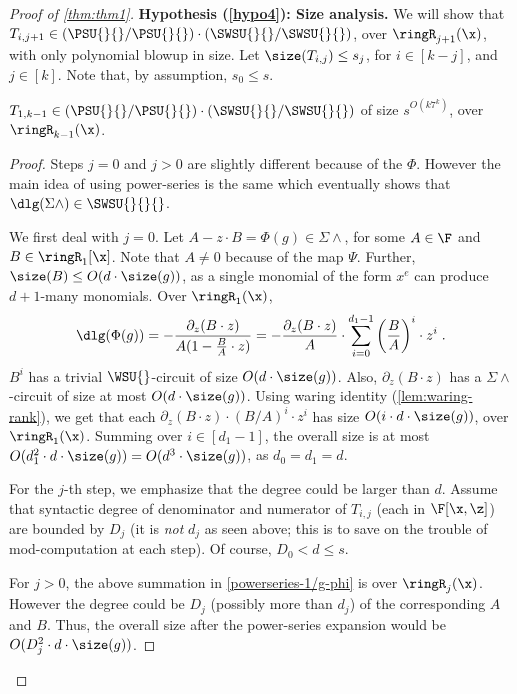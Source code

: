 \begin{proof}[Proof of \autoref{thm:thm1}]
%

\smallskip
\noindent \textbf{Hypothesis (\ref{hypo4}): Size analysis.} We will show that $T_{i,j+1} \in (\PSU{}{}/\PSU{}{}) \cdot (\SWSU{}{}/\SWSU{}{})$, over $\ringR_{j+1}(\x)$, with only polynomial blowup in size.  Let $\size(T_{i,j}) \le s_j$, for $i \in [k-j]$, and $j \in [k]$. Note that, by assumption, $s_0 \le s$.

\begin{claim} \label{cl:size-bound-on-Ti}
$T_{1,k-1} \in (\PSU{}{}/\PSU{}{}) \cdot (\SWSU{}{}/\SWSU{}{})$ of size $s^{O(k7^k)}$, over $\ringR_{k-1}(\x)$.
\end{claim}

\begin{proof}
Steps $j=0$ and $j>0$ are slightly different because of the $\Phi$. However the main idea of using power-series is the same which eventually shows that $\dlg(\Sigma \wedge) \in \SWSU{}{}{}$. 

We first deal with $j=0$. Let $A-z \cdot B= \Phi(g) \in \Sigma \wedge$, for some $A \in \F$ and $B \in \ringR_1[\x]$. Note that $A \ne 0$ because of the map $\Psi$. Further, $\size(B) \le O(d \cdot \size(g))$, as a single monomial of the form $x^e$ can produce $d+1$-many monomials. Over $\ringR_1(\x)$,
\begin{align}
    \dlg(\Phi(g)) = -\frac{\partial_{z}(B\cdot z)}{A(1- \frac{B}{A}\cdot z)}  = -\frac{\partial_{z}(B\cdot z)}{A} \cdot \sum_{i=0}^{d_1-1} \left(\frac{B}{A}\right)^{i} \cdot z^i\;. \label{powerseries-1/g-phi}
\end{align}
$B^i$ has a trivial $\WSU{}$-circuit of size $O(d \cdot \size(g))$.  Also, $\partial_{z}(B\cdot z)$ has a $\Sigma \wedge$-circuit of size at most $O(d\cdot \size(g))$. Using waring identity (\autoref{lem:waring-rank}), we get that each $\partial_{z}(B\cdot z) \cdot (B/A)^i \cdot z^i$ has size $O(i\cdot d \cdot \size(g))$, over $\ringR_1(\x)$. Summing over $i \in [d_1-1]$, the overall size is at most $ O(d_1^2\cdot d \cdot \size(g))=O(d^3 \cdot \size(g))$, as $d_0=d_1=d$. 

For the $j$-th step, we emphasize that the degree could be larger than $d$. Assume that syntactic degree of denominator and numerator of $T_{i,j}$ (each in $\F[\x,\z]$) are bounded by $D_{j}$ (it is {\em not} $d_j$ as seen above; this is to save on the trouble of mod-computation at each step). Of course, $D_0<d \le s$. 

For $j>0$, the above summation in \autoref{powerseries-1/g-phi} is over $\ringR_{j}(\x)$. However the degree could be $D_j$ (possibly more than $d_j$) of the corresponding $A$ and $B$. Thus, the overall size after the power-series expansion would be $O(D_j^2 \cdot d \cdot \size(g))$. 


\end{proof}
\end{proof}
